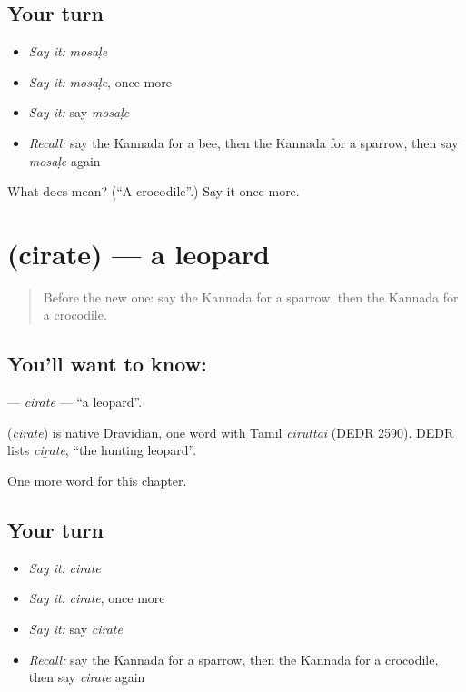 \subsection*{Your turn}
\begin{itemize}
\raggedright
  \item \emph{Say it:} \emph{mosaḷe}
  \item \emph{Say it:} \emph{mosaḷe}, once more
  \item \emph{Say it:} say \emph{mosaḷe}
  \item \emph{Recall:} say the Kannada for a bee, then the Kannada for a sparrow, then say \emph{mosaḷe} again
\end{itemize}

\begin{tcolorbox}[breakable,colback=teal!4,colframe=teal!35!black,title={Before you move on}]
What does  mean? (\textquotedblleft{}A crocodile\textquotedblright{}.) Say it once more.
\end{tcolorbox}
\section[\texorpdfstring{\kn{ಚಿರತೆ} (cirate)}{ಚಿರತೆ (cirate)}]{ (cirate) — a leopard}

\label{lesson:KA-C297-cirate}



\begin{quote}
Before the new one: say the Kannada for a sparrow, then the Kannada for a crocodile.
\end{quote}

\subsection*{You'll want to know: }
\textbf{} — \emph{cirate} — \textquotedblleft{}a leopard\textquotedblright{}.

\begin{cousinweb}
\textbf{} (\emph{cirate}) is native Dravidian, one word with Tamil \emph{ciṟuttai} (DEDR 2590). DEDR lists \emph{ciṟate}, \textquotedblleft{}the hunting leopard\textquotedblright{}.
\end{cousinweb}

\begin{grammarlens}[title={What you've built}]
One more word for this chapter.
\end{grammarlens}

\subsection*{Your turn}
\begin{itemize}
\raggedright
  \item \emph{Say it:} \emph{cirate}
  \item \emph{Say it:} \emph{cirate}, once more
  \item \emph{Say it:} say \emph{cirate}
  \item \emph{Recall:} say the Kannada for a sparrow, then the Kannada for a crocodile, then say \emph{cirate} again
\end{itemize}

